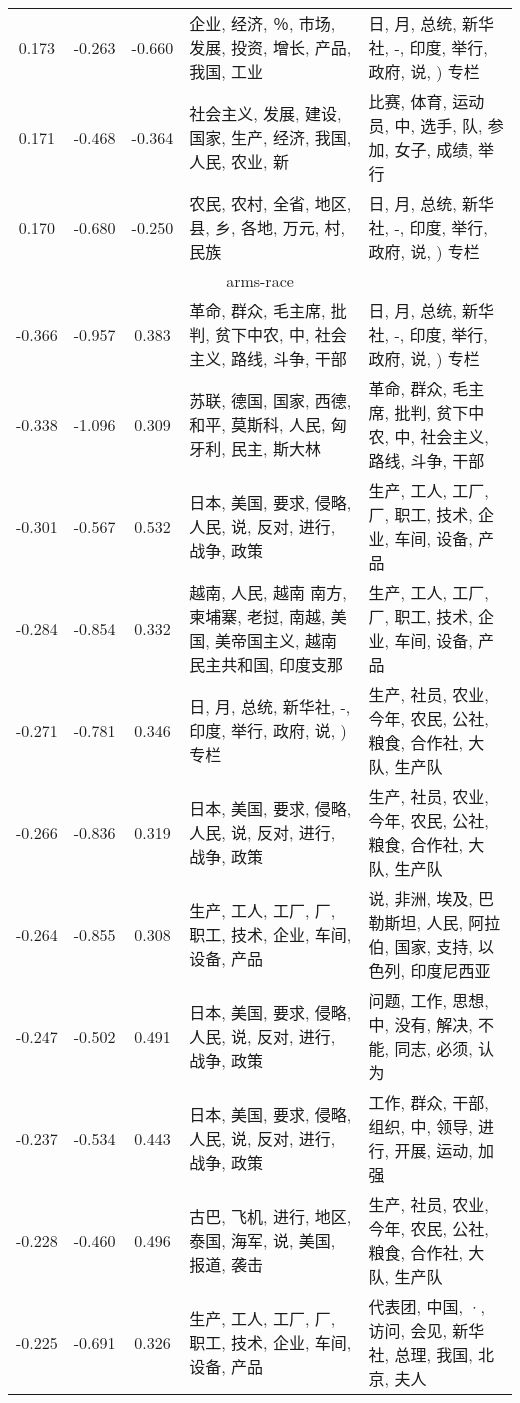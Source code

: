 \begin{tabular}{cccp{5cm}p{5cm}}
0.173 & -0.263 & -0.660 & 企业, 经济, ％, 市场, 发展, 投资, 增长, 产品, 我国, 工业 & 日, 月, 总统, 新华社, -, 印度, 举行, 政府, 说, ) 专栏 \\
0.171 & -0.468 & -0.364 & 社会主义, 发展, 建设, 国家, 生产, 经济, 我国, 人民, 农业, 新 & 比赛, 体育, 运动员, 中, 选手, 队, 参加, 女子, 成绩, 举行 \\
0.170 & -0.680 & -0.250 & 农民, 农村, 全省, 地区, 县, 乡, 各地, 万元, 村, 民族 & 日, 月, 总统, 新华社, -, 印度, 举行, 政府, 说, ) 专栏 \\
\midrule
\multicolumn{5}{c}{arms-race}\\
-0.366 & -0.957 & 0.383 & 革命, 群众, 毛主席, 批判, 贫下中农, 中, 社会主义, 路线, 斗争, 干部 & 日, 月, 总统, 新华社, -, 印度, 举行, 政府, 说, ) 专栏 \\
-0.338 & -1.096 & 0.309 & 苏联, 德国, 国家, 西德, 和平, 莫斯科, 人民, 匈牙利, 民主, 斯大林 & 革命, 群众, 毛主席, 批判, 贫下中农, 中, 社会主义, 路线, 斗争, 干部 \\
-0.301 & -0.567 & 0.532 & 日本, 美国, 要求, 侵略, 人民, 说, 反对, 进行, 战争, 政策 & 生产, 工人, 工厂, 厂, 职工, 技术, 企业, 车间, 设备, 产品 \\
-0.284 & -0.854 & 0.332 & 越南, 人民, 越南 南方, 柬埔寨, 老挝, 南越, 美国, 美帝国主义, 越南民主共和国, 印度支那 & 生产, 工人, 工厂, 厂, 职工, 技术, 企业, 车间, 设备, 产品 \\
-0.271 & -0.781 & 0.346 & 日, 月, 总统, 新华社, -, 印度, 举行, 政府, 说, ) 专栏 & 生产, 社员, 农业, 今年, 农民, 公社, 粮食, 合作社, 大队, 生产队 \\
-0.266 & -0.836 & 0.319 & 日本, 美国, 要求, 侵略, 人民, 说, 反对, 进行, 战争, 政策 & 生产, 社员, 农业, 今年, 农民, 公社, 粮食, 合作社, 大队, 生产队 \\
-0.264 & -0.855 & 0.308 & 生产, 工人, 工厂, 厂, 职工, 技术, 企业, 车间, 设备, 产品 & 说, 非洲, 埃及, 巴勒斯坦, 人民, 阿拉伯, 国家, 支持, 以色列, 印度尼西亚 \\
-0.247 & -0.502 & 0.491 & 日本, 美国, 要求, 侵略, 人民, 说, 反对, 进行, 战争, 政策 & 问题, 工作, 思想, 中, 没有, 解决, 不能, 同志, 必须, 认为 \\
-0.237 & -0.534 & 0.443 & 日本, 美国, 要求, 侵略, 人民, 说, 反对, 进行, 战争, 政策 & 工作, 群众, 干部, 组织, 中, 领导, 进行, 开展, 运动, 加强 \\
-0.228 & -0.460 & 0.496 & 古巴, 飞机, 进行, 地区, 泰国, 海军, 说, 美国, 报道, 袭击 & 生产, 社员, 农业, 今年, 农民, 公社, 粮食, 合作社, 大队, 生产队 \\
-0.225 & -0.691 & 0.326 & 生产, 工人, 工厂, 厂, 职工, 技术, 企业, 车间, 设备, 产品 & 代表团, 中国, ·, 访问, 会见, 新华社, 总理, 我国, 北京, 夫人 \\

\end{tabular}
